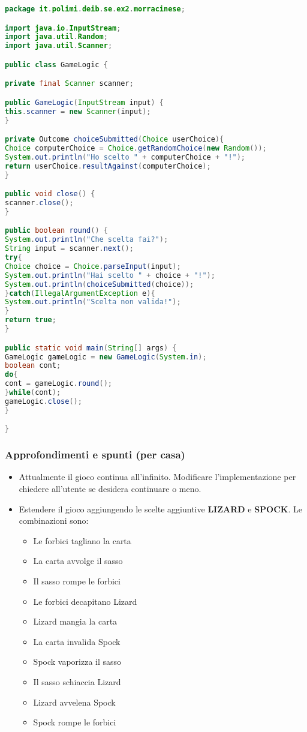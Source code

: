 \documentclass{article}
\begin{document}
\begin{lstlisting}[language=Java,escapechar=|]
package it.polimi.deib.se.ex2.morracinese;

import java.io.InputStream;
import java.util.Random;
import java.util.Scanner;

public class GameLogic {	

private final Scanner scanner;

public GameLogic(InputStream input) {
this.scanner = new Scanner(input);
}

private Outcome choiceSubmitted(Choice userChoice){
Choice computerChoice = Choice.getRandomChoice(new Random());
System.out.println("Ho scelto " + computerChoice + "!");
return userChoice.resultAgainst(computerChoice);
}

public void close() {
scanner.close();		
}

public boolean round() {
System.out.println("Che scelta fai?");
String input = scanner.next();
try{
Choice choice = Choice.parseInput(input);
System.out.println("Hai scelto " + choice + "!");
System.out.println(choiceSubmitted(choice));
}catch(IllegalArgumentException e){
System.out.println("Scelta non valida!");
}
return true; 
}

public static void main(String[] args) {
GameLogic gameLogic = new GameLogic(System.in);
boolean cont;
do{
cont = gameLogic.round();
}while(cont);
gameLogic.close();
}

}
\end{lstlisting}

\subsubsection{Approfondimenti e spunti (per casa)}

\begin{itemize}
	\item Attualmente il gioco continua all'infinito. Modificare l'implementazione per chiedere all'utente se desidera continuare o meno.
	\item Estendere il gioco aggiungendo le scelte aggiuntive \textbf{LIZARD} e \textbf{SPOCK}. Le combinazioni sono:
	\begin{itemize}
			\item Le forbici tagliano la carta
			\item La carta avvolge il sasso
			\item Il sasso rompe le forbici
			\item Le forbici decapitano Lizard
			\item Lizard mangia la carta
			\item La carta invalida Spock
			\item Spock vaporizza il sasso
			\item Il sasso schiaccia Lizard
			\item Lizard avvelena Spock
			\item Spock rompe le forbici
	\end{itemize}
\end{itemize}
\end{document}
